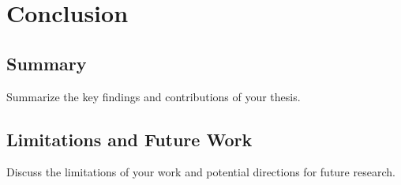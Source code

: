 \chapter{Conclusion}
\label{ch:conclusion}

\section{Summary}
\label{sec:summary}

Summarize the key findings and contributions of your thesis.

\section{Limitations and Future Work}
\label{sec:future_work}

Discuss the limitations of your work and potential directions for future research.
